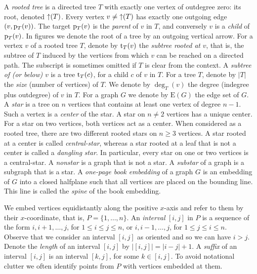 \documentclass[11pt,a4paper,colorlinks=true,urlcolor=blue,citecolor=red]{article}
\theoremstyle{plain}
\begin{document}
A \emph{rooted tree} is a directed tree $T$ with exactly one vertex of
outdegree zero: its root, denoted $\mathop{\uparrow}(T)$. Every vertex $v\ne\mathop{\uparrow}(T)$ has
exactly one outgoing edge $(v,\mathrm p_T(v))$. The target $\mathrm p_T(v)$ is the
\emph{parent} of $v$ in $T$, and conversely $v$ is a \emph{child} of
$\mathrm p_T(v)$. In figures we denote the root of a tree by an outgoing
vertical arrow. For a vertex $v$ of a rooted tree $T$, denote by
$\mathrm t_T(v)$ the \emph{subtree rooted at $v$}, that is, the subtree of $T$
induced by the vertices from which $v$ can be reached on a directed
path. The subscript is sometimes omitted if $T$ is clear from the
context. A \emph{subtree of (or below) $v$} is a tree $\mathrm t_T(c)$, for a
child $c$ of $v$ in $T$. For a tree $T$, denote by $|T|$ the \emph{size}
(number of vertices) of $T$. We denote by $\deg_T(v)$ the degree
(indegree plus outdegree) of $v$ in $T$. For a graph $G$ we denote by
$\mathrm{E}(G)$ the edge set of $G$. A \emph{star} is a tree on $n$
vertices that contains at least one vertex of degree $n-1$. Such a
vertex is a \emph{center} of the star. A star on $n\ne 2$ vertices has a
unique center. For a star on two vertices, both vertices act as a
center. When considered as a rooted tree, there are two different rooted
stars on $n\geq 3$ vertices. A star rooted at a center is called
\emph{central-star}, whereas a star rooted at a leaf
that is not a center is called a \emph{dangling star}. In particular,
every star on one or two vertices is a central-star. A \emph{nonstar} is
a graph that is not a star. A \emph{substar} of a graph is a subgraph
that is a star.
A \emph{one-page book embedding} of a graph $G$ is an embedding of $G$
into a closed halfplane such that all vertices are placed on the
bounding line. This line is called the \emph{spine} of the book
embedding.

We embed vertices equidistantly along the positive $x$-axis and refer to
them by their $x$-coordinate, that is, $P=\{1,\ldots,n\}$. An
\emph{interval} $[i,j]$ in $P$ is a sequence of the form
$i,i+1,\ldots,j$, for $1\le i\le j\le n$, or $i,i-1,\ldots,j$, for
$1\le j\le i\le n$. Observe that we consider an interval $[i,j]$ as
oriented and so we can have $i>j$. Denote the \emph{length} of an
interval $[i,j]$ by $|[i,j]|=|i-j|+1$.  A \emph{suffix} of an interval
$[i,j]$ is an interval $[k,j]$, for some $k\in[i,j]$. To avoid
notational clutter we often identify points from $P$ with vertices
embedded at them.
\end{document}
